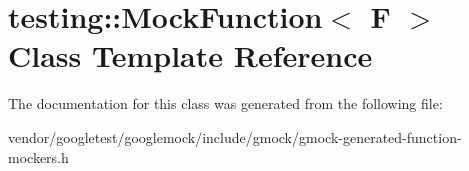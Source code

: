 \hypertarget{classtesting_1_1MockFunction}{}\section{testing\+:\+:Mock\+Function$<$ F $>$ Class Template Reference}
\label{classtesting_1_1MockFunction}


The documentation for this class was generated from the following file\+:\begin{DoxyCompactItemize}
\item 
vendor/googletest/googlemock/include/gmock/gmock-\/generated-\/function-\/mockers.\+h\end{DoxyCompactItemize}

